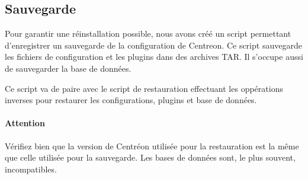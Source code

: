 	\subsection{Sauvegarde}

	Pour garantir une réinstallation possible, nous avons créé un script permettant d'enregistrer un sauvegarde de la configuration de Centreon.
	Ce script sauvegarde les fichiers de configuration et les plugins dans des archives TAR.
	Il s'occupe aussi de sauvegarder la base de données.

	Ce script va de paire avec le script de restauration effectuant les oppérations inverses pour restaurer les configurations, plugins et base de données.

	\paragraph{Attention} Vérifiez bien que la version de Centréon utilisée pour la restauration est la même que celle utilisée pour la sauvegarde. Les bases de données sont, le plus souvent, incompatibles.
